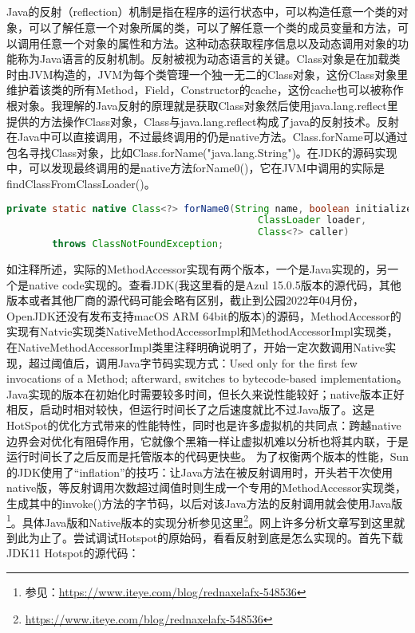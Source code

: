 \documentclass[../../../interview-questions.tex]{subfiles}
\begin{document}
\subsection{\color{red}{Java反射的实现原理}}

Java的反射（reflection）机制是指在程序的运行状态中，可以构造任意一个类的对象，可以了解任意一个对象所属的类，可以了解任意一个类的成员变量和方法，可以调用任意一个对象的属性和方法。这种动态获取程序信息以及动态调用对象的功能称为Java语言的反射机制。反射被视为动态语言的关键。Class对象是在加载类时由JVM构造的，JVM为每个类管理一个独一无二的Class对象，这份Class对象里维护着该类的所有Method，Field，Constructor的cache，这份cache也可以被称作根对象。我理解的Java反射的原理就是获取Class对象然后使用java.lang.reflect里提供的方法操作Class对象，Class与java.lang.reflect构成了java的反射技术。反射在Java中可以直接调用，不过最终调用的仍是native方法。Class.forName可以通过包名寻找Class对象，比如Class.forName("java.lang.String")。在JDK的源码实现中，可以发现最终调用的是native方法forName0()，它在JVM中调用的实际是findClassFromClassLoader()。

\begin{lstlisting}[language=Java]
private static native Class<?> forName0(String name, boolean initialize,
                                            ClassLoader loader,
                                            Class<?> caller)
        throws ClassNotFoundException;
\end{lstlisting}

如注释所述，实际的MethodAccessor实现有两个版本，一个是Java实现的，另一个是native code实现的。查看JDK(我这里看的是Azul 15.0.5版本的源代码，其他版本或者其他厂商的源代码可能会略有区别，截止到公园2022年04月份，OpenJDK还没有发布支持macOS ARM 64bit的版本)的源码，MethodAccessor的实现有Natvie实现类NativeMethodAccessorImpl和MethodAccessorImpl实现类，在NativeMethodAccessorImpl类里注释明确说明了，开始一定次数调用Native实现，超过阈值后，调用Java字节码实现方式：Used only for the first few invocations of a Method; afterward, switches to bytecode-based implementation。Java实现的版本在初始化时需要较多时间，但长久来说性能较好；native版本正好相反，启动时相对较快，但运行时间长了之后速度就比不过Java版了。这是HotSpot的优化方式带来的性能特性，同时也是许多虚拟机的共同点：跨越native边界会对优化有阻碍作用，它就像个黑箱一样让虚拟机难以分析也将其内联，于是运行时间长了之后反而是托管版本的代码更快些。
为了权衡两个版本的性能，Sun的JDK使用了“inflation”的技巧：让Java方法在被反射调用时，开头若干次使用native版，等反射调用次数超过阈值时则生成一个专用的MethodAccessor实现类，生成其中的invoke()方法的字节码，以后对该Java方法的反射调用就会使用Java版\footnote{参见：\url{https://www.iteye.com/blog/rednaxelafx-548536}}。具体Java版和Native版本的实现分析参见这里\footnote{\url{https://www.iteye.com/blog/rednaxelafx-548536}}。网上许多分析文章写到这里就到此为止了。尝试调试Hotspot的原始码，看看反射到底是怎么实现的。首先下载JDK11 Hotspot的源代码：
\end{document}
